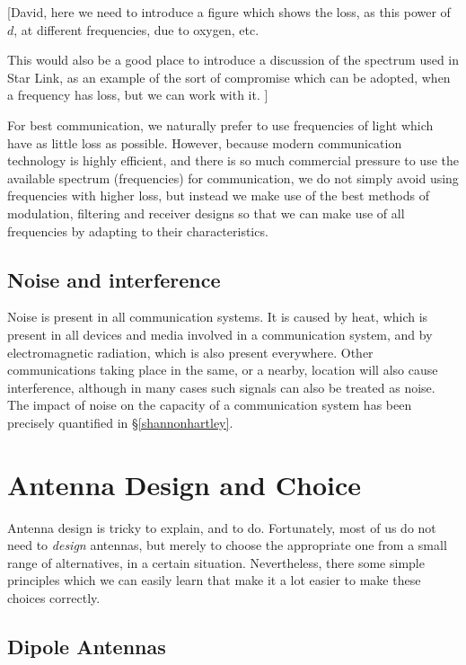 [David, here we need to introduce a figure which shows the loss, as this power of $d$,
at different frequencies, due to oxygen, etc.

This would also be a good place to introduce a discussion of the spectrum used
in Star Link, as an example of the sort of compromise which can be adopted, when
a frequency has loss, but we can work with it.
]

For best communication, we naturally prefer to use frequencies of light
which have as little loss as possible. However, because modern communication technology is
highly efficient, and there is so much commercial pressure to use the available
spectrum (frequencies) for communication, we do not simply avoid using frequencies
with higher loss, but instead we make use of the best methods of modulation, filtering
and receiver designs so that we can make use of all frequencies by adapting to their
characteristics.

\subsection{Noise and interference}

Noise is present in all communication systems. It is caused by heat, which
is present in all devices and media involved in a communication system,
and by electromagnetic radiation, which is also present everywhere. Other
communications taking place in the same, or a nearby, location will
also cause interference, although in many cases such signals can also be
treated as noise. The impact of noise on the capacity of a communication
system has been precisely quantified in \S\ref{shannonhartley}.

\section{Antenna Design and Choice}

Antenna design is tricky to explain, and to do. Fortunately,
most of us do not need to {\em design} antennas, but merely to
choose the appropriate one from a small range of alternatives, in
a certain situation. Nevertheless, there some simple principles
which we can easily learn that make it a lot easier to make these
choices correctly.

\subsection{Dipole Antennas}

